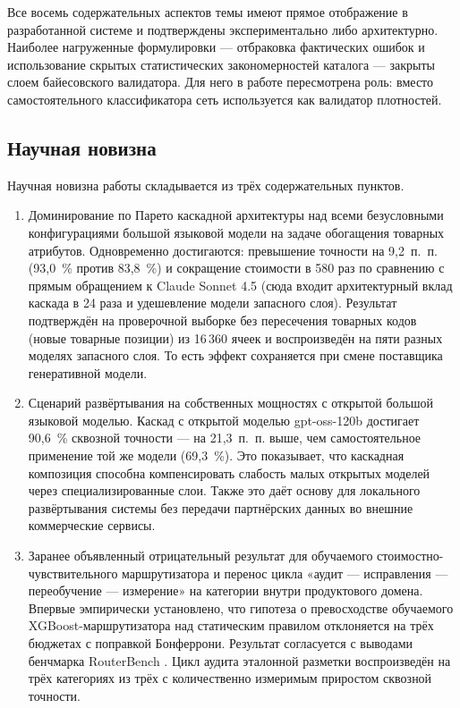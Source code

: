 Все восемь содержательных аспектов темы имеют прямое отображение в разработанной системе и подтверждены экспериментально либо архитектурно. Наиболее нагруженные формулировки — отбраковка фактических ошибок и использование скрытых статистических закономерностей каталога — закрыты слоем байесовского валидатора. Для него в работе пересмотрена роль: вместо самостоятельного классификатора сеть используется как валидатор плотностей.

\subsection*{Научная новизна}

Научная новизна работы складывается из трёх содержательных пунктов.

\begin{enumerate}[label=\arabic*)]
    \item Доминирование по Парето каскадной архитектуры над всеми безусловными конфигурациями большой языковой модели на задаче обогащения товарных атрибутов. Одновременно достигаются: превышение точности на 9,2~п.~п. (93,0~\% против 83,8~\%) и сокращение стоимости в 580 раз по сравнению с прямым обращением к Claude Sonnet 4.5 (сюда входит архитектурный вклад каскада в 24 раза и удешевление модели запасного слоя). Результат подтверждён на проверочной выборке без пересечения товарных кодов (новые товарные позиции) из 16\,360 ячеек и воспроизведён на пяти разных моделях запасного слоя. То есть эффект сохраняется при смене поставщика генеративной модели.
    \item Сценарий развёртывания на собственных мощностях с открытой большой языковой моделью. Каскад с открытой моделью gpt-oss-120b достигает 90,6~\% сквозной точности — на 21,3~п.~п. выше, чем самостоятельное применение той же модели (69,3~\%). Это показывает, что каскадная композиция способна компенсировать слабость малых открытых моделей через специализированные слои. Также это даёт основу для локального развёртывания системы без передачи партнёрских данных во внешние коммерческие сервисы.
    \item Заранее объявленный отрицательный результат для обучаемого стоимостно-чувствительного маршрутизатора и перенос цикла «аудит — исправления — переобучение — измерение» на категории внутри продуктового домена. Впервые эмпирически установлено, что гипотеза о превосходстве обучаемого XGBoost-маршрутизатора над статическим правилом отклоняется на трёх бюджетах с поправкой Бонферрони. Результат согласуется с выводами бенчмарка RouterBench \cite{ref_12}. Цикл аудита эталонной разметки воспроизведён на трёх категориях из трёх с количественно измеримым приростом сквозной точности.
\end{enumerate}

